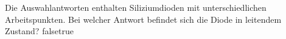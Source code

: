     {Die Auswahlantworten enthalten Siliziumdioden mit unterschiedlichen Arbeitspunkten. Bei welcher Antwort befindet sich die Diode in leitendem Zustand?}
    {}
    {}
    {}
    {}
    {false}{true}